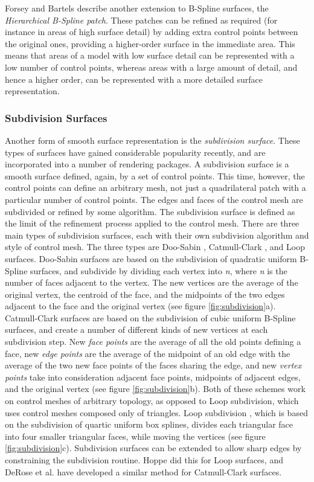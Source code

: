 \documentclass[10pt,oneside,fleqn,a4paper]{book}
\begin{document}
Forsey and Bartels \cite{Forsey88} describe another extension to B-Spline surfaces, the {\it Hierarchical B-Spline patch}. These patches can be refined as required (for instance in areas of high surface detail) by adding extra control points between the original ones, providing a higher-order surface in the immediate area. This means that areas of a model with low surface detail can be represented with a low number of control points, whereas areas with a large amount of detail, and hence a higher order, can be represented with a more detailed surface representation.

\subsubsection{Subdivision Surfaces}
Another form of smooth surface representation is the {\it subdivision surface}. These types of surfaces have gained considerable popularity recently, and are incorporated into a number of rendering packages. A subdivision surface is a smooth surface defined, again, by a set of control points. This time, however, the control points can define an arbitrary mesh, not just a quadrilateral patch with a particular number of control points. The edges and faces of the control mesh are subdivided or refined by some algorithm. The subdivision surface is defined as the limit of the refinement process applied to the control mesh. There are three main types of subdivision surfaces, each with their own subdivision algorithm and style of control mesh. The three types are Doo-Sabin \cite{Doo78}, Catmull-Clark \cite{Catmull78}, and Loop \cite{Loop94} surfaces. Doo-Sabin surfaces are based on the subdivision of quadratic uniform B-Spline surfaces, and subdivide by dividing each vertex into {\it n}, where {\it n} is the number of faces adjacent to the vertex. The new vertices are the average of the original vertex, the centroid of the face, and the midpoints of the two edges adjacent to the face and the original vertex (see figure \ref{fig:subdivision}a). Catmull-Clark surfaces are based on the subdivision of cubic uniform B-Spline surfaces, and create a number of different kinds of new vertices at each subdivision step. New {\it face points} are the average of all the old points defining a face, new {\it edge points} are the average of the midpoint of an old edge with the average of the two new face points of the faces sharing the edge, and new {\it vertex points} take into consideration adjacent face points, midpoints of adjacent edges, and the original vertex (see figure \ref{fig:subdivision}b). Both of these schemes work on control meshes of arbitrary topology, as opposed to Loop subdivision, which uses control meshes composed only of triangles. Loop subdivision , which is based on the subdivision of quartic uniform box splines, divides each triangular face into four smaller triangular faces, while moving the vertices (see figure \ref{fig:subdivision}c). Subdivision surfaces can be extended to allow sharp edges by constraining the subdivision routine. Hoppe \cite{Hoppe94a} did this for Loop surfaces, and DeRose et al.\cite{DeRose98} have developed a similar method for Catmull-Clark surfaces.
\end{document}
